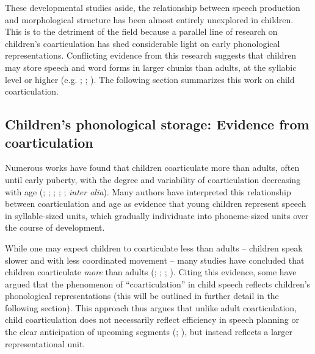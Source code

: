 \documentclass[a4paper,man,floatsintext,natbib,donotrepeattitle, apacite]{apa6}
\begin{document}
These developmental studies aside, the relationship between speech production and morphological structure has been almost entirely unexplored in children. This is to the detriment of the field because a parallel line of research on children's coarticulation has shed considerable light on early phonological representations. Conflicting evidence from this research suggests that children may store speech and word forms in larger chunks than adults, at the syllabic level or higher (e.g. \citealt{nittrouerEmergencePhoneticSegments1989};  \citealt{noirayBackFutureNonlinear2019}; \citealt{zharkovaCoarticulationIndicatorSpeech2011}). The following section summarizes this work on child coarticulation.

\subsection{Children's phonological storage: Evidence from coarticulation}

Numerous works have found that children coarticulate more than adults, often until early puberty, with the degree and variability of coarticulation decreasing with age (\citealt{goodellAcousticEvidenceDevelopment1992}; \citealt{nittrouerEmergencePhoneticSegments1989}; \citealt{nittrouerHowChildrenLearn1996}; \citealt{noirayBackFutureNonlinear2019};  \citealt{zharkovaSpatialTemporalLingual2014}; \citealt{zharkovaDynamicsVoicelessSibilant2018} \textit{inter alia}). Many authors have interpreted this relationship between coarticulation and age as evidence that young children represent speech in syllable-sized units, which gradually individuate into phoneme-sized units over the course of development. 

While one may expect children to coarticulate less than adults – children speak slower and with less coordinated movement \citep{smithStabilityPatterningSpeech1998} – many studies have concluded that children coarticulate \textit{more} than adults (\citealt{goodellAcousticEvidenceDevelopment1992}; \citealt{nittrouerEmergencePhoneticSegments1989}; \citealt{nittrouerHowChildrenLearn1996};  \citealt{zharkovaCoarticulationIndicatorSpeech2011}). Citing this evidence, some have argued that the phenomenon of ``coarticulation'' in child speech reflects children's phonological representations (this will be outlined in further detail in the following section). This approach thus argues that unlike adult coarticulation, child coarticulation does not necessarily reflect efficiency in speech planning or the clear anticipation of upcoming segments (\citealt{whalenCoarticulationLargelyPlanned1990}; \citealt{bradlowConfluentTalkerListeneroriented2002}), but instead reflects a larger representational unit. 
\end{document}
